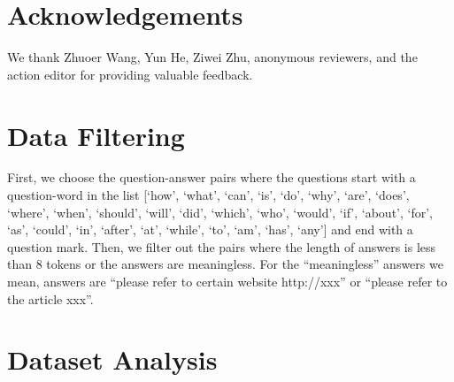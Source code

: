 \documentclass[11pt]{article}
\begin{document}
\section*{Acknowledgements}

We thank Zhuoer Wang, Yun He, Ziwei Zhu, anonymous reviewers, and the action editor for providing valuable feedback.




\appendix
\gdef\thesection{Appendix \Alph{section}}

\section{Data Filtering}
\label{sec:data-preprocess}

First, we choose the question-answer pairs where the questions start with a question-word in the list [`how', `what', `can', `is', `do', `why', `are', `does', `where', `when', `should', `will', `did', `which', `who', `would', `if', `about', `for', `as', `could', `in', `after', `at', `while', `to', `am', `has', `any'] and end with a question mark. Then, we filter out the pairs where the length of answers is less than 8 tokens or the answers are meaningless. For the ``meaningless'' answers we mean, answers are ``please refer to certain website http://xxx'' or ``please refer to the article xxx''.

\section{Dataset Analysis}
\label{sec:dataset-analysis}
\end{document}
